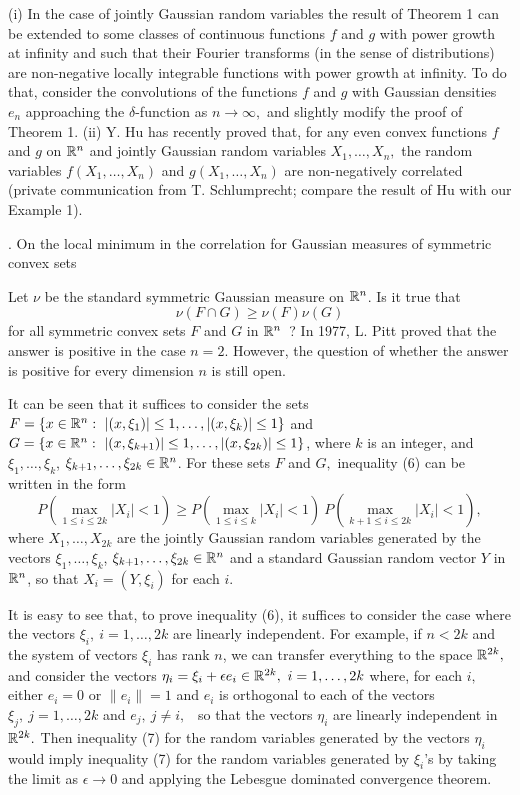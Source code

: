 \medbreak

(i) In the case of jointly Gaussian random variables
the result of Theorem 1  can be extended
to some classes of continuous  functions $f$ and $g$ with power
growth at infinity and such that their Fourier transforms 
(in the sense of distributions) are non-negative locally integrable
functions with power growth at infinity. 
To do that, consider the convolutions
of the functions $f$ and $g$ with Gaussian densities $e_n$
approaching the $\delta$-function as $n\to \infty,$ and
slightly modify the proof of Theorem 1. 
\smallbreak
(ii) Y. Hu has recently 
proved that, for any even convex functions $f$ and $g$ on $\Bbb R^n$
and jointly Gaussian random variables $X_1,\dots,X_n,$ the 
random variables $f(X_1,\dots,X_n)$ and $g(X_1,\dots,X_n)$
are non-negatively correlated (private communication from 
T. Schlumprecht; compare the result of Hu with our Example 1).


\bigbreak




. On the local minimum in the correlation
for Gaussian measures of symmetric convex sets   \endhead

Let $\nu$ be the standard symmetric Gaussian measure on
$\Bbb R^n$.  Is it true that
$$\nu(F\cap G)\ge \nu(F)\nu(G)\tag{6}$$ 
for all symmetric convex sets $F$ and $G$ in $\Bbb R^n$~?
In 1977, L. Pitt proved that the answer is positive in the case 
$n=2$.  However, the question of whether the answer is
positive for every dimension $n$ is still open.

It can be seen that it suffices to consider the sets
$F=\{x\in \Bbb R^n:\ |(x,\xi_1)|\le 1,\dots,|(x,\xi_k)|\le 1\}$ and
$G=\{x\in \Bbb R^n:\ |(x,\xi_{k+1})|\le 1,\dots,|(x,\xi_{2k})|\le 1\}$,
where $k$ is an integer, and
$\xi_1,\dots,\xi_k$, $\xi_{k+1},\dots,\xi_{2k}\in \Bbb R^n$.
For these sets $F$ and $G,$ inequality (6) can be written in 
the form
$$P(\max_{1\le i\le 2k} |X_i|<1) \ge
P(\max_{1\le i\le k} |X_i|<1)        
\ P(\max_{k+1\le i\le 2k} |X_i|<1), \tag{7}$$
where $X_1,\dots, X_{2k}$ are the jointly Gaussian
random variables generated by the vectors 
$\xi_1,\dots,\xi_k$, $\xi_{k+1},\dots,\xi_{2k}\in \Bbb R^n$
and a standard Gaussian random vector $Y$ in $\Bbb R^n$, 
so that $X_i=(Y,\xi_i)$
for each $i.$

It is easy to see that, to prove inequality (6),
it suffices to consider the case where the vectors $\xi_i,\ i=1,\dots,2k$
are linearly independent. For example, if $n<2k$ and
the system of vectors $\xi_i$ has rank $n$, 
we can transfer everything to the
space $\Bbb R^{2k},$ and  
consider the vectors $\eta_i=\xi_i + \epsilon e_i
\in \Bbb R^{2k},\ i=1,\dots,2k $ 
where, for each $i,$ 
either $e_i=0$ or $\|e_i\|=1$ and $e_i$ is orthogonal to
each of the vectors $\xi_j,\ j=1,\dots,2k$ and $e_j,\ j\neq i,$
\ so that the vectors $\eta_i$ 
are linearly independent in $\Bbb R^{2k}.$ 
Then inequality (7) for the random variables generated by
the vectors $\eta_i$ would
imply inequality (7) for the random variables 
generated by $\xi_i$'s by taking the limit as 
$\epsilon \to 0$ and applying the Lebesgue dominated convergence 
theorem.

